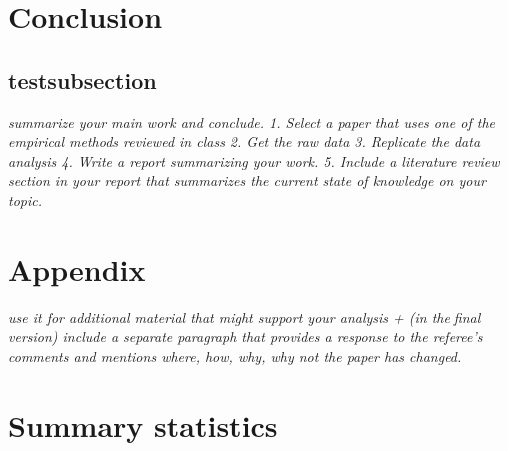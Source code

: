\documentclass[11pt]{article}
\begin{document}
\section{ Conclusion}
\subsection{testsubsection}
\textit{	summarize your main work and conclude.
	1. Select a paper that uses one of the empirical methods reviewed in class
	2. Get the raw data
	3. Replicate the data analysis
	4. Write a report summarizing your work.
	5. Include a literature review section in your report that summarizes the current state
	of knowledge on your topic.
}



\newpage

\begin{subappendices}
	\appendix
	
	\section*{Appendix}\label{Appendix}
	\textit{use it for additional material that might support your analysis + (in thefinal version) include a separate paragraph that provides a response to the referee's comments and mentions where, how, why, why not the paper has changed.}
	\singlespacing
	\section{Summary statistics}\label{ASec:xxxxx}
	
	
\end{subappendices}	




\newpage
{\footnotesize 
	
	\singlespacing
	
}


\end{document}
